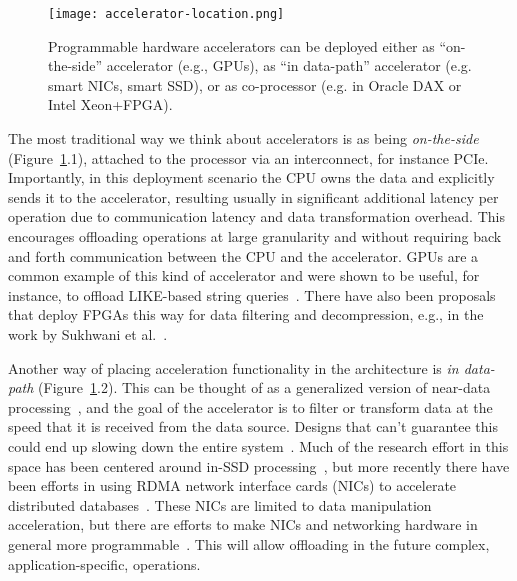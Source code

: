 \documentclass[11pt]{article}
\begin{document}
\begin{figure}[h]
\centering
\texttt{[image: accelerator-location.png]}
\caption{Programmable hardware accelerators can be deployed either as ``on-the-side'' accelerator (e.g., GPUs), as ``in data-path'' accelerator (e.g. smart NICs, smart SSD), or as co-processor (e.g. in Oracle DAX or Intel Xeon+FPGA). \label{fig:acceleratorlocations}}
\end{figure}

The most traditional way we think about accelerators is as being \emph{on-the-side} (Figure~\ref{fig:acceleratorlocations}.1), attached to the processor via an interconnect, for instance PCIe. Importantly, in this deployment scenario the CPU owns the data and explicitly sends it to the accelerator, resulting usually in significant additional latency per operation due to communication latency and data transformation overhead. This encourages offloading operations at large granularity and without requiring back and forth communication between the CPU and the accelerator. GPUs are a common example of this kind of accelerator and were shown to be useful, for instance, to offload LIKE-based string queries~\cite{sitaridi-gpuregex-2016}. There have also been proposals that deploy FPGAs this way for data filtering and decompression, e.g., in the work by Sukhwani et al.~\cite{sukhwani-dbanalyitcs-ieee14}.

Another way of placing acceleration functionality in the architecture is \emph{in data-path} (Figure~\ref{fig:acceleratorlocations}.2). This can be thought of as a generalized version of near-data processing~\cite{oskin-active-ieee98}, and the goal of the accelerator is to filter or transform data at the speed that it is received from the data source. Designs that can't guarantee this could end up slowing down the entire system~\cite{koo-summarizer-micro17}. Much of the research effort in this space has been centered around in-SSD processing~\cite{jo-yoursql-vldb16}\cite{woods-Ibex-vldb14}, but more recently there have been efforts in using RDMA network interface cards (NICs) to accelerate distributed databases~\cite{barthels-join-sigmod15}\cite{dragojevic-farm-debull17}. These NICs are limited to data manipulation acceleration, but there are efforts to make NICs and networking hardware in general more programmable~\cite{bosshart-p4-comrew14}. This will allow offloading in the future complex, application-specific, operations.
\end{document}
